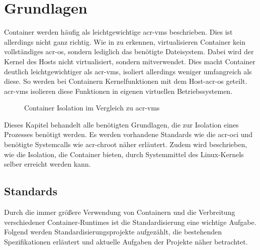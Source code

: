 \chapter{Grundlagen}
\label{chap:grundlagen}
Container werden häufig als leichtgewichtige \glspl{acr-vm} beschrieben. Dies ist allerdings nicht ganz richtig. Wie in  zu erkennen, virtualisieren Container kein vollständiges \gls{acr-os}, sondern lediglich das benötigte Dateisystem. Dabei wird der Kernel des Hosts nicht virtualisiert, sondern mitverwendet. Dies macht Container deutlich leichtgewichtiger als \glspl{acr-vm}, isoliert allerdings weniger umfangreich als diese. So werden bei Containern Kernelfunktionen mit dem Host-\gls{acr-os} geteilt. \glspl{acr-vm} isolieren diese Funktionen in eigenen virtuellen Betriebssystemen.
\begin{figure}[h]
		\hfill
		\caption{Container Isolation im Vergleich zu \glspl{acr-vm}}
		\label{fig:containerVsVm}
\end{figure}

Dieses Kapitel behandelt alle benötigten Grundlagen, die zur Isolation eines Prozesses benötigt werden. Es werden vorhandene Standards wie die \gls{acr-oci} und benötigte Systemcalls wie \gls{acr-chroot} näher erläutert. Zudem wird beschrieben, wie die Isolation, die Container bieten, durch Systemmittel des Linux-Kernels selber erreicht werden kann.
\section{Standards}
\label{sec:standards}
Durch die immer größere Verwendung von Containern und die Verbreitung verschiedener Container-Runtimes ist die Standardisierung eine wichtige Aufgabe. Folgend werden Standardisierungsprojekte aufgezählt, die bestehenden Spezifikationen erläutert und aktuelle Aufgaben der Projekte näher betrachtet.
